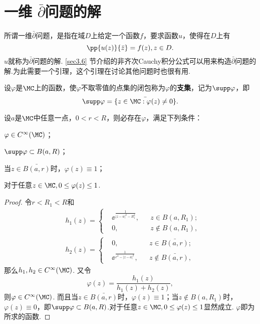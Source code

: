 \section{一维 \texorpdfstring{$\bar \partial$}{∂̅}问题的解}
所谓一维$\bar\partial$问题，是指在域$D$上给定一个函数$f$，要求函数$u$，使得在$D$上有
\[\pp{u(z)}{\bar z}=f(z),z\in D.\]
$u$就称为$\bar\partial$问题的解. \ref{sec3.6} 节介绍的非齐次Cauchy积分公式可以用来构造$\bar\partial$问题的解.为此需要一个引理，这个引理在讨论其他问题时也很有用.
\begin{definition}\label{def3.7.1}
设$\varphi$是$\MC$上的函数，使$\varphi$不取零值的点集的闭包称为$\varphi$的\textbf{支集}，记为$\supp\varphi$，即
\[\supp\varphi=\bar{\{z\in\MC:\varphi(z)\ne0\}}.\]
\end{definition}
\begin{lemma}\label{lemma3.7.2}
设$a$是$\MC$中任意一点，$0<r<R$，则必存在$\varphi$，满足下列条件：
\begin{eenum}
  \item $\varphi\in C^{\infty}(\MC)$；
  \item $\supp\varphi\subset B(a,R)$；
  \item 当$z\in\bar{B(a,r)}$时，$\varphi(z)\equiv1$；
  \item 对于任意$z\in\MC,0\le\varphi(z)\le1$.
\end{eenum}
\end{lemma}
\begin{proof}
令$r<R_1<R$和
\begin{align*}
&h_1(z)=\left\{\begin{aligned}
&\ee^{\frac1{|z-a|^2-R_1^2}},&&z\in B(a,R_1);\\
&0,&&z\notin B(a,R_1),
\end{aligned}\right.\\
&h_2(z)=\left\{\begin{aligned}
&0,&&z\in \bar{B(a,r)};\\
&\ee^{\frac1{r^2-|z-a|^2}},&&z\notin\bar{B(a,r)},
\end{aligned}\right.
\end{align*}
那么$h_1,h_2\in C^\infty(\MC)$. 又令
\[\varphi(z)=\frac{h_1(z)}{h_1(z)+h_2(z)},\]
则$\varphi\in C^\infty(\MC)$. 而且当$z\in \bar{B(a,r)}$时，$\varphi(z)\equiv1$；当$z\notin B(a,R_1)$时，$\varphi(z)\equiv0$，即$\supp\varphi\subset B(a,R)$.对于任意$z\in\MC,0\le\varphi(z)\le1$显然成立. $\varphi$即为所求的函数.
\end{proof}

